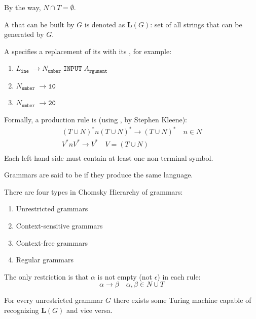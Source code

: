 \documentclass{article}
\begin{document}
By the way, $N \cap T = \emptyset$.
\plush{}

A  that can be built by $G$ is denoted as $\bm{L}(G)$: set of all strings that can be generated by $G$.
\plush{}

A  specifies a replacement of its  with its , for example:
\begin{enumerate}
    \item[1.] $L_\texttt{ine} \; \to N_\texttt{umber} \; \texttt{INPUT} \; A_\texttt{rgument}$
    \item[2.] $N_\texttt{umber} \; \to \texttt{10}$
    \item[3.] $N_\texttt{umber} \; \to \texttt{20}$
\end{enumerate}

Formally, a production rule is (using , by Stephen Kleene):
\begin{gather*}
(T \cup N)^* n (T \cup N)^* \to (T \cup N)^* \quad n \in N \\
V^* n V^* \to V^* \quad V = (T \cup N) \\
\end{gather*}
Each left-hand side must contain at least one non-terminal symbol.
\plush{}

Grammars are said to be  if they produce the same language.
\plush{}


There are four types in Chomsky Hierarchy of grammars:
\begin{enumerate}
  \item[Type-0:] Unrestricted grammars
  \item[Type-1:] Context-sensitive grammars
  \item[Type-2:] Context-free grammars
  \item[Type-3:] Regular grammars
\end{enumerate}
\plush{}


The only restriction is that $\alpha$ is not empty (not \(\epsilon\)) in each rule:
\begin{equation*}
\alpha \to \beta \quad \alpha, \beta \in N \cup T
\end{equation*}

For every unrestricted grammar $G$ there exists some Turing machine capable of recognizing $\bm{L}(G)$ and vice versa.
\plush{}
\end{document}
